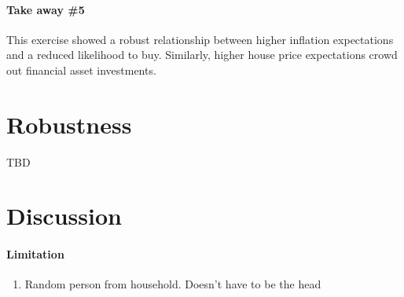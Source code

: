 \documentclass[ProjectABM]{subfiles}
\begin{document}
\paragraph{Take away \#5}
This exercise showed a robust relationship between higher inflation expectations and a reduced likelihood to buy. Similarly, higher house price expectations crowd out financial asset investments.

\section{Robustness}\label{sec:robustness}
TBD

\section{Discussion}\label{sec:discussion}
\paragraph{Limitation}
\begin{enumerate}
	\item Random person from household. Doesn't have to be the head
\end{enumerate}

\onlyinsubfile{}
%
\end{document}

